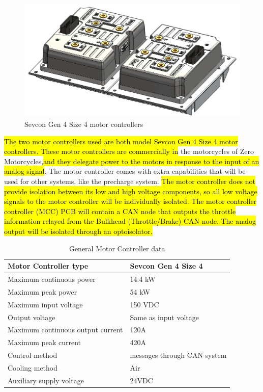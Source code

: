 \documentclass{article}
\DeclareRobustCommand{\hlr}[1]{{\sethlcolor{red}\hl{#1}}}
\begin{document}
            \begin{figure}[H]
                \centering
                \includegraphics[width = 0.7 \textwidth]{motorcontrollers_separate}
                \caption{Sevcon Gen 4 Size 4 motor controllers}
                \label{mcoffcar}
            \end{figure}

            \hlr{The two motor controllers used are both model Sevcon Gen 4 Size 4 motor controllers. These motor controllers are commercially in} the motorcycles of Zero Motorcycles,\hlr{and they delegate power to the motors in response to the input of an analog signal}. The motor controller comes with extra capabilities that will be used for other systems, like the precharge system. \hlr{The motor controller does not provide isolation between its low and high voltage components, so all low voltage signals to the motor controller will be individually isolated. The motor controller controller (MCC) PCB will contain a CAN node that outputs the throttle information relayed from the Bulkhead (Throttle/Brake) CAN node. The analog output will be isolated through an optoisolator.}

            \begin{table}[H]
            \centering
            \begin{tabular}{|l|l|}
            \hline
            Motor Controller type & Sevcon Gen 4 Size 4 \\ \hline
            Maximum continuous power & 14.4 kW \\ \hline
            Maximum peak power & 54 kW \\ \hline
            Maximum input voltage & 150 VDC \\ \hline
            Output voltage & Same as input voltage \\ \hline
            Maximum continuous output current & 120A \\ \hline
            Maximum peak current & 420A \\ \hline
            Control method & messages through CAN system \\ \hline
            Cooling method & Air \\ \hline
            Auxiliary supply voltage & 24VDC \\ \hline
            \end{tabular}
            \caption{General Motor Controller data}
            \label{MC}
            \end{table}
\end{document}
